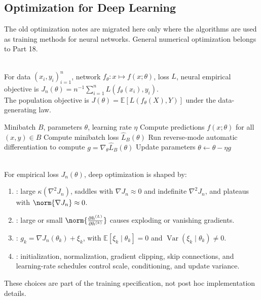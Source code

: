 \subsection{Optimization for Deep Learning}

The old optimization notes are migrated here only where the algorithms are used as training methods for neural networks.  General numerical optimization belongs to Part 18.

\begin{definition} \label{def:sl-neural-empirical-objective} \\
For data $(x_i,y_i)_{i=1}^n$, network $f_\theta:x\mapsto f(x;\theta)$, loss $L$, neural empirical objective is $J_n(\theta)=n^{-1}\sum\limits_{i=1}^nL(f_\theta(x_i),y_i)$.\\
The population objective is $J(\theta)=\mathbb E[L(f_\theta(X),Y)]$ under the data-generating law.
\end{definition}

\begin{breakablealgorithm}
\caption{Minibatch Backpropagation Step}
\label{alg:sl-minibatch-backpropagation-step}
\begin{algorithmic}
\Require Minibatch $B$, parameters $\theta$, learning rate $\eta$
\State Compute predictions $f(x;\theta)$ for all $(x,y)\in B$
\State Compute minibatch loss $\widehat{L}_B(\theta)$
\State Run reverse-mode automatic differentiation to compute $g=\nabla_{\theta}\widehat{L}_B(\theta)$
\State Update parameters $\theta \leftarrow \theta-\eta g$
\end{algorithmic}
\end{breakablealgorithm}

\begin{remark} \label{rem:sl-deep-optimization-challenges} \\
For empirical loss $J_n(\theta)$, deep optimization is shaped by:
\begin{enumerate}[label=(\roman*)]
\setlength{\itemsep}{0pt}
\item {}: large $\kappa(\nabla^2J_n)$, saddles with $\nabla J_n\approx0$ and indefinite $\nabla^2J_n$, and plateaus with $\norm{\nabla J_n}\approx0$.
\item {}: large or small $\norm{\frac{\partial h^{(L)}}{\partial h^{(k)}}}$ causes exploding or vanishing gradients.
\item {}: $g_k=\nabla J_n(\theta_k)+\xi_k$, with $\mathbb E[\xi_k\mid\theta_k]=0$ and $\operatorname{Var}(\xi_k\mid\theta_k)\ne0$.
\item {}: initialization, normalization, gradient clipping, skip connections, and learning-rate schedules control scale, conditioning, and update variance.
\end{enumerate}
These choices are part of the training specification, not post hoc implementation details.
\end{remark}

